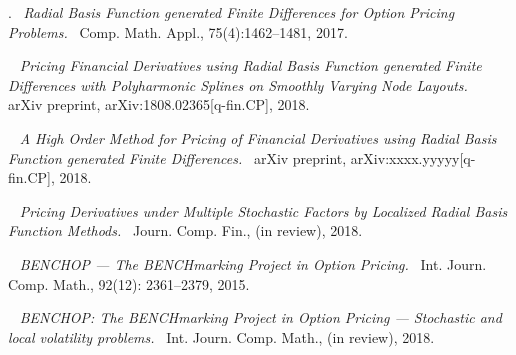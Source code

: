 \documentclass{UUThesisTemplate}
\begin{document}
\frontmatter
    \frontmatterCS

   \dedication{``These violent delights have violent ends''\\(Romeo and Juliet: Act 2, Scene 6, Line 9)}

    \begin{listofpapers}
    \item
    .\ %
    \emph{Radial Basis Function generated Finite Differences for Option Pricing Problems.}\ %
    Comp. Math. Appl., 75(4):1462--1481, 2017. \label{paper1} %
    \item
    \ %
    \emph{Pricing Financial Derivatives using Radial Basis Function generated Finite Differences with Polyharmonic Splines on Smoothly Varying Node Layouts.}\ %
    arXiv preprint, arXiv:1808.02365[q-fin.CP], 2018. \label{paper2} %
    \item
    \ %
    \emph{A High Order Method for Pricing of Financial Derivatives using Radial Basis Function generated Finite Differences.}\ %
    arXiv preprint, arXiv:xxxx.yyyyy[q-fin.CP], 2018. \label{paper3} %
    \item
    \ %
    \emph{Pricing Derivatives under Multiple Stochastic Factors by Localized Radial Basis Function Methods.}\ %
    Journ. Comp. Fin., (in review), 2018. \label{paper4} %
    \item
    \ %
    \emph{BENCHOP --- The BENCHmarking Project in Option Pricing.}\ %
    Int. Journ. Comp. Math., 92(12): 2361--2379, 2015. \label{paper5}
    \item
    \ %
    \emph{BENCHOP: The BENCHmarking Project in Option Pricing --- Stochastic and local volatility problems.}\ %
    Int. Journ. Comp. Math., (in review), 2018. \label{paper6}
    \end{listofpapers}
	
\end{document}
